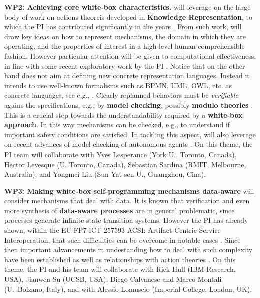 \textbf{WP2: Achieving core white-box characteristics.}
 \project will leverage on the large
body of work on actions theoreis developed in \textbf{Knowledge
Representation}, to which the PI has contributed significantly in the
years
\cite{DeGiacomoRS98,DeGiacomoLL00,DeGiacomoLS01,SardinaGLL04,SardinaG09,DeGiacomoLP10,DeGiacomoLM12,DeGiacomoLPV14,DeGiacomoLPV16,BanihashemiGL17}. From
such work, \project will draw key ideas on how to represent
mechanisms, the domain in which they are operating, and the properties
of interest in a high-level human-comprehensible fashion. However
particular attention will be given to computational effectiveness, in
line with some recent exploratory work by the PI
\cite{DeGLP16,DeGiacomoLPS16,CDMP17}.  
Notice that on the other hand \project does not aim at defining new concrete representation languages. Instead it intends to use well-known formalisms such as BPMN, UML, OWL, etc. as concrete languages, see e.g., \cite{CAISE17}.
Clearly replanned behaviors
  must be  \emph{verifiable} agains the specifications, e.g., by \textbf{model checking},
  possibly \textbf{modulo theories} \cite{EiterGS10}.
  This is a crucial step towards the understandability required by a
  \textbf{white-box approach}.  In this way mechanisms can be checked, e.g.,  to understand if important safety conditions are
  satisfied. In tackling this aspect, \project will also leverage on
  recent advances of model checking of autonomous
  agents \cite{Wooldridge09,LomuscioQR17}.
On this theme, the PI team will
collaborate with Yves Lesperance (York U., Toronto, Canada), Hector
Levesque (U. Toronto, Canada), Sebastian Sardina (RMIT, Melbourne,
Australia), and Yongmei Liu (Sun Yat-sen U., Guangzhou, Cina).

\textbf{WP3: Making white-box self-programming mechanisms data-aware} 
\project will consider mechanisms that
deal with data. It is known that verification and even more
synthesis of \textbf{data-aware processes} are in general problematic, since
processes generate infinite-state transition systems. However the PI has
already shown, within the EU FP7-ICT-257593 ACSI: Artifact-Centric
Service Interoperation, that such difficulties can be overcome in
notable cases
\cite{BerardiCGHM05,CalvaneseGHS09,HaririCGDM13,CalvaneseGMP13}. Since
then important advancements in undestanding how to deal with such
complexity have been established as well as relationships with action theories
\cite{HaririCMGMF13,BelardinelliLP14,CalvaneseGS15,CDMP17}.  On this
theme, the PI and his team will collaborate with Rick Hull (IBM Research,
USA), Jianwen Su (UCSB, USA), Diego Calvanese and
Marco Montali (U.\ Bolzano, Italy), and with Alessio Lomuscio
(Imperial College, London, UK).





